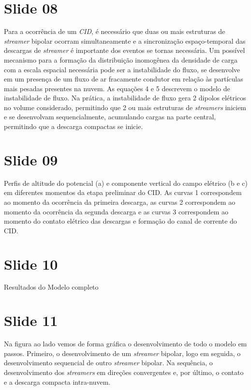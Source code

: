 \documentclass[a4paper, 12pt, onecolumn,singlespacing]{article}
\begin{document}
	\section{Slide 08}
	
		Para a ocorrência de um \textit{CID}, é necessário que duas ou mais estruturas de \textit{streamer} bipolar ocorram simultaneamente e a sincronização espaço-temporal das	descargas de \textit{streamer} é importante dos eventos se tornas necessária. Um possível mecanismo para a formação da distribuição inomogênea da densidade de carga com a escala espacial necessária pode ser a instabilidade do fluxo, se desenvolve em um presença de um fluxo de ar fracamente condutor em relação às partículas mais pesadas presentes na nuvem. As equações 4 e 5 descrevem o modelo de instabilidade de fluxo. Na prática, a instabilidade de fluxo gera 2 dipolos elétricos no volume considerado, permitindo que 2 ou mais estruturas de \textit{streamers} iniciem e se desenvolvam sequencialmente, acumulando cargas na parte central, permitindo que a descarga compactas se inicie.
	
	\section{Slide 09}
	
		Perfis de altitude do potencial (a) e componente vertical do campo elétrico (b e c) em diferentes momentos da etapa preliminar do CID. As curvas 1 correspondem ao momento da ocorrência da primeira descarga, as curvas 2 correspondem ao momento da ocorrência da segunda descarga e as curvas 3 correspondem ao momento do	contato elétrico das descargas e formação do canal de corrente do CID.
	
	\section{Slide 10}
	
	Resultados do Modelo completo
	
	\section{Slide 11}
	
		Na figura ao lado vemos de forma gráfica o desenvolvimento de todo o modelo em passos. Primeiro, o desenvolvimento de um \textit{streamer} bipolar, logo em seguida, o desenvolvimento sequencial de outro \textit{streamer} bipolar. Na sequência, o desenvolvimento dos \textit{streamers} em direções convergentes e, por último, o contato e a descarga compacta intra-nuvem. 
	
\end{document}

